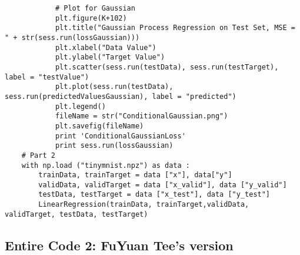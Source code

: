 \documentclass[a4paper,12pt]{article}
\begin{document}
\begin{verbatim}
            # Plot for Gaussian
            plt.figure(K+102)
            plt.title("Gaussian Process Regression on Test Set, MSE = " + str(sess.run(lossGaussian)))
            plt.xlabel("Data Value")
            plt.ylabel("Target Value")
            plt.scatter(sess.run(testData), sess.run(testTarget), label = "testValue")
            plt.plot(sess.run(testData), sess.run(predictedValuesGaussian), label = "predicted")
            plt.legend()
            fileName = str("ConditionalGaussian.png")
            plt.savefig(fileName)
            print 'ConditionalGaussianLoss'
            print sess.run(lossGaussian)
    # Part 2
    with np.load ("tinymnist.npz") as data :
        trainData, trainTarget = data ["x"], data["y"]
        validData, validTarget = data ["x_valid"], data ["y_valid"]
        testData, testTarget = data ["x_test"], data ["y_test"]
        LinearRegression(trainData, trainTarget,validData, validTarget, testData, testTarget)
\end{verbatim}

\subsection{Entire Code 2: FuYuan Tee's version}
\end{document}
